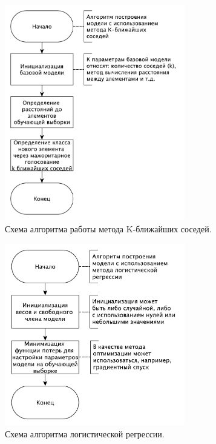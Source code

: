 \begin{figure}[H]
	\centering
	\includegraphics[width=0.7\textwidth]{inc/schemeKnn.pdf}
	\caption{ Схема алгоритма работы метода K-ближайших соседей. }
	\label{img:schemeKnn}
\end{figure}

\begin{figure}[H]
	\centering
	\includegraphics[width=0.7\textwidth]{inc/schemeLogistic.pdf}
	\caption{ Схема алгоритма логистической регрессии. }
	\label{img:schemeLogistic}
\end{figure}

